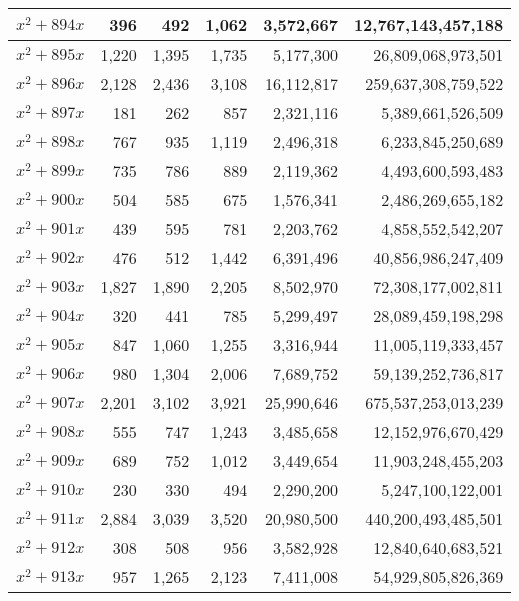 \documentclass[a4paper]{amsproc}
\theoremstyle{plain}
\begin{document}
\begin{longtable}{ | l | r | r | r | r | r | }
$x^2 + 894x$ & 396 & 492 & 1{,}062 & 3{,}572{,}667 & 12{,}767{,}143{,}457{,}188 \\ \hline
$x^2 + 895x$ & 1{,}220 & 1{,}395 & 1{,}735 & 5{,}177{,}300 & 26{,}809{,}068{,}973{,}501 \\ \hline
$x^2 + 896x$ & 2{,}128 & 2{,}436 & 3{,}108 & 16{,}112{,}817 & 259{,}637{,}308{,}759{,}522 \\ \hline
$x^2 + 897x$ & 181 & 262 & 857 & 2{,}321{,}116 & 5{,}389{,}661{,}526{,}509 \\ \hline
$x^2 + 898x$ & 767 & 935 & 1{,}119 & 2{,}496{,}318 & 6{,}233{,}845{,}250{,}689 \\ \hline
$x^2 + 899x$ & 735 & 786 & 889 & 2{,}119{,}362 & 4{,}493{,}600{,}593{,}483 \\ \hline
$x^2 + 900x$ & 504 & 585 & 675 & 1{,}576{,}341 & 2{,}486{,}269{,}655{,}182 \\ \hline
$x^2 + 901x$ & 439 & 595 & 781 & 2{,}203{,}762 & 4{,}858{,}552{,}542{,}207 \\ \hline
$x^2 + 902x$ & 476 & 512 & 1{,}442 & 6{,}391{,}496 & 40{,}856{,}986{,}247{,}409 \\ \hline
$x^2 + 903x$ & 1{,}827 & 1{,}890 & 2{,}205 & 8{,}502{,}970 & 72{,}308{,}177{,}002{,}811 \\ \hline
$x^2 + 904x$ & 320 & 441 & 785 & 5{,}299{,}497 & 28{,}089{,}459{,}198{,}298 \\ \hline
$x^2 + 905x$ & 847 & 1{,}060 & 1{,}255 & 3{,}316{,}944 & 11{,}005{,}119{,}333{,}457 \\ \hline
$x^2 + 906x$ & 980 & 1{,}304 & 2{,}006 & 7{,}689{,}752 & 59{,}139{,}252{,}736{,}817 \\ \hline
$x^2 + 907x$ & 2{,}201 & 3{,}102 & 3{,}921 & 25{,}990{,}646 & 675{,}537{,}253{,}013{,}239 \\ \hline
$x^2 + 908x$ & 555 & 747 & 1{,}243 & 3{,}485{,}658 & 12{,}152{,}976{,}670{,}429 \\ \hline
$x^2 + 909x$ & 689 & 752 & 1{,}012 & 3{,}449{,}654 & 11{,}903{,}248{,}455{,}203 \\ \hline
$x^2 + 910x$ & 230 & 330 & 494 & 2{,}290{,}200 & 5{,}247{,}100{,}122{,}001 \\ \hline
$x^2 + 911x$ & 2{,}884 & 3{,}039 & 3{,}520 & 20{,}980{,}500 & 440{,}200{,}493{,}485{,}501 \\ \hline
$x^2 + 912x$ & 308 & 508 & 956 & 3{,}582{,}928 & 12{,}840{,}640{,}683{,}521 \\ \hline
$x^2 + 913x$ & 957 & 1{,}265 & 2{,}123 & 7{,}411{,}008 & 54{,}929{,}805{,}826{,}369 \\ \hline

\end{longtable}
\end{document}
